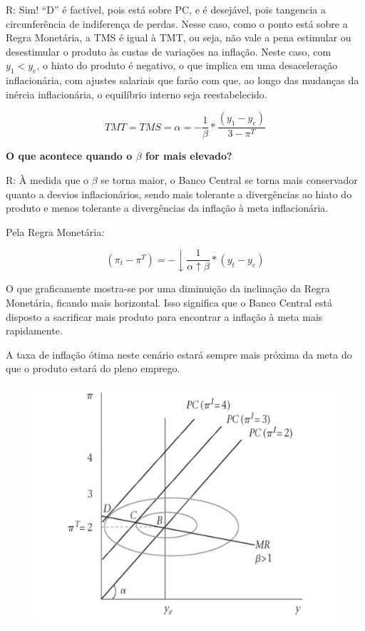 \documentclass[a4paper,12pt]{article}[abntex2]
\begin{document}
R: Sim! “D” é factível, pois está sobre PC, e é desejável, pois tangencia a circunferência de indiferença de perdas. Nesse caso, como o ponto está sobre a Regra Monetária, a TMS é igual à TMT, ou seja, não vale a pena estimular ou desestimular o produto às custas de variações na inflação. Neste caso, com \(y_1 < y_e\), o hiato do produto é negativo, o que implica em uma desaceleração inflacionária, com ajustes salariais que farão com que, ao longo das mudanças da inércia inflacionária, o equilíbrio interno seja reestabelecido.

\[
TMT = TMS = \alpha = - \frac{1}{\beta} * \frac{(y_1 - y_e)}{3 - \pi^T}
\]

\textbf{O que acontece quando o $\beta$ for mais elevado?}

R: À medida que o $\beta$ se torna maior, o Banco Central se torna mais conservador quanto a desvios inflacionários, sendo mais tolerante a divergências ao hiato do produto e menos tolerante a divergências da inflação à meta inflacionária.

Pela Regra Monetária:

\[
(\pi_t - \pi^T) = - \downarrow{\frac{1}{\alpha \uparrow{\beta}}} * (y_t - y_e)
\]

O que graficamente mostra-se por uma diminuição da inclinação da Regra Monetária, ficando mais horizontal. Isso significa que o Banco Central está disposto a sacrificar mais produto para encontrar a inflação à meta mais rapidamente.

A taxa de inflação ótima neste cenário estará sempre mais próxima da meta do que o produto estará do pleno emprego.

\begin{figure}[H]
    \centering
    \includegraphics[width=0.7\linewidth]{Imagens/a15i6.png}
\end{figure}
\end{document}
